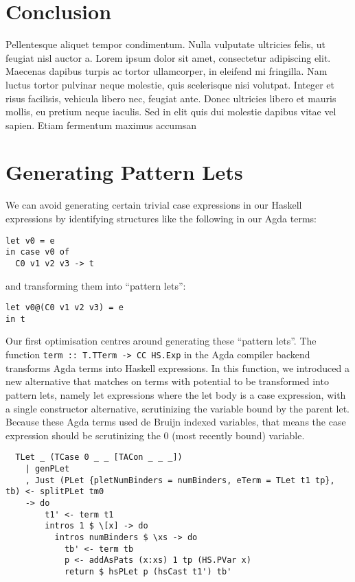 
\section{Conclusion}
\label{sec:problem_formulation_conclusion}

Pellentesque aliquet tempor condimentum. Nulla vulputate ultricies felis, ut feugiat nisl auctor a. Lorem ipsum dolor sit amet, consectetur adipiscing elit. Maecenas dapibus turpis ac tortor ullamcorper, in eleifend mi fringilla. Nam luctus tortor pulvinar neque molestie, quis scelerisque nisi volutpat. Integer et risus facilisis, vehicula libero nec, feugiat ante. Donec ultricies libero et mauris mollis, eu pretium neque iaculis. Sed in elit quis dui molestie dapibus vitae vel sapien. Etiam fermentum maximus accumsan



\section{Generating Pattern Lets}

We can avoid generating certain trivial case expressions in our Haskell expressions by identifying structures like the following in our Agda terms:

\begin{lstlisting}
let v0 = e
in case v0 of
  C0 v1 v2 v3 -> t
\end{lstlisting}

and transforming them into ``pattern lets'':

\begin{lstlisting}
let v0@(C0 v1 v2 v3) = e
in t
\end{lstlisting}

Our first optimisation centres around generating these ``pattern lets''. The function \lstinline{term :: T.TTerm -> CC HS.Exp} in the Agda compiler backend transforms Agda terms into Haskell expressions. In this function, we introduced a new alternative that matches on terms with potential to be transformed into pattern lets, namely let expressions where the let body is a case expression, with a single constructor alternative, scrutinizing the variable bound by the parent let. Because these Agda terms used de Bruijn indexed variables, that means the case expression should be scrutinizing the 0 (most recently bound) variable.

\begin{lstlisting}
  TLet _ (TCase 0 _ _ [TACon _ _ _])
    | genPLet
    , Just (PLet {pletNumBinders = numBinders, eTerm = TLet t1 tp}, tb) <- splitPLet tm0
    -> do
        t1' <- term t1
        intros 1 $ \[x] -> do
          intros numBinders $ \xs -> do
            tb' <- term tb
            p <- addAsPats (x:xs) 1 tp (HS.PVar x)
            return $ hsPLet p (hsCast t1') tb'
\end{lstlisting}

